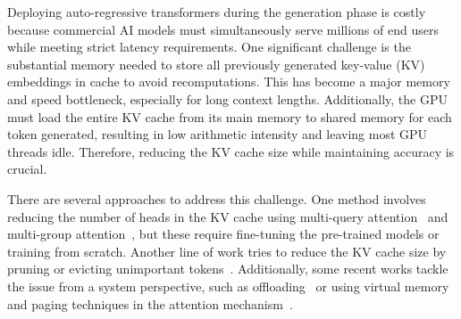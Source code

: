 \documentclass[11pt]{article}
\theoremstyle{plain}
\theoremstyle{definition}
\theoremstyle{remark}
\begin{document}

Deploying auto-regressive transformers during the generation phase is costly because commercial AI models must simultaneously serve millions of end users while meeting strict latency requirements. 
One significant challenge is the substantial memory needed to store all previously generated key-value (KV) embeddings in cache to avoid recomputations. 
This has become a major memory and speed bottleneck, especially for long context lengths.
Additionally, the GPU must load the entire KV cache from its main memory to shared memory for each token generated, resulting in low arithmetic intensity and leaving most GPU threads idle. 
Therefore, reducing the KV cache size while maintaining accuracy is crucial. 


There are several approaches to address this challenge. 
One method involves reducing the number of heads in the KV cache using multi-query attention~\cite{shazeer2019fast} and multi-group attention~\cite{ainslie2023gqa}, but these require fine-tuning the pre-trained models or training from scratch.
Another line of work tries to reduce the KV cache size by pruning or evicting unimportant tokens~\cite{zhang2024h2o, liu2024scissorhands, xiao2023efficient, zandieh2024subgen}. 
Additionally, some recent works tackle the issue from a system perspective, such as offloading~\cite{sheng2023flexgen} or using virtual memory and paging techniques in the attention mechanism~\cite{kwon2023efficient}.
\end{document}
